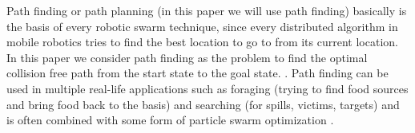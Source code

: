 
  Path finding or path planning (in this paper we will use path finding) basically is the basis of every robotic swarm technique, since every distributed algorithm in mobile robotics tries to find the best location to go to from its current location. In this paper we consider path finding as the problem to find the optimal collision free path from the start state to the goal state. \cite{qin2004path}. Path finding can be used in multiple real-life applications such as foraging (trying to find food sources and bring food back to the basis) \cite{hoff2010two} and searching (for spills, victims, targets) \cite{pugh2007inspiring} and is often combined with some form of particle swarm optimization \cite{poli2007particle}.